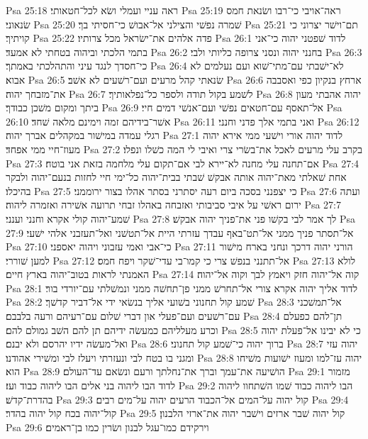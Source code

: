 Psa 25:18  ראה עניי ועמלי ושׂא לכל־חטאותי׃
Psa 25:19  ראה־אויבי כי־רבו ושׂנאת חמס שׂנאוני׃
Psa 25:20  שׁמרה נפשׁי והצילני אל־אבושׁ כי־חסיתי בך׃
Psa 25:21  תם־וישׁר יצרוני כי קויתיך׃
Psa 25:22  פדה אלהים את־ישׂראל מכל צרותיו׃
Psa 26:1  לדוד שׁפטני יהוה כי־אני בתמי הלכתי וביהוה בטחתי לא אמעד׃
Psa 26:2  בחנני יהוה ונסני צרופה כליותי ולבי׃
Psa 26:3  כי־חסדך לנגד עיני והתהלכתי באמתך׃
Psa 26:4  לא־ישׁבתי עם־מתי־שׁוא ועם נעלמים לא אבוא׃
Psa 26:5  שׂנאתי קהל מרעים ועם־רשׁעים לא אשׁב׃
Psa 26:6  ארחץ בנקיון כפי ואסבבה את־מזבחך יהוה׃
Psa 26:7  לשׁמע בקול תודה ולספר כל־נפלאותיך׃
Psa 26:8  יהוה אהבתי מעון ביתך ומקום משׁכן כבודך׃
Psa 26:9  אל־תאסף עם־חטאים נפשׁי ועם־אנשׁי דמים חיי׃
Psa 26:10  אשׁר־בידיהם זמה וימינם מלאה שׁחד׃
Psa 26:11  ואני בתמי אלך פדני וחנני׃
Psa 26:12  רגלי עמדה במישׁור במקהלים אברך יהוה׃
Psa 27:1  לדוד יהוה אורי וישׁעי ממי אירא יהוה מעוז־חיי ממי אפחד׃
Psa 27:2  בקרב עלי מרעים לאכל את־בשׂרי צרי ואיבי לי המה כשׁלו ונפלו׃
Psa 27:3  אם־תחנה עלי מחנה לא־יירא לבי אם־תקום עלי מלחמה בזאת אני בוטח׃
Psa 27:4  אחת שׁאלתי מאת־יהוה אותה אבקשׁ שׁבתי בבית־יהוה כל־ימי חיי לחזות בנעם־יהוה ולבקר בהיכלו׃
Psa 27:5  כי יצפנני בסכה ביום רעה יסתרני בסתר אהלו בצור ירוממני׃
Psa 27:6  ועתה ירום ראשׁי על איבי סביבותי ואזבחה באהלו זבחי תרועה אשׁירה ואזמרה ליהוה׃
Psa 27:7  שׁמע־יהוה קולי אקרא וחנני וענני׃
Psa 27:8  לך אמר לבי בקשׁו פני את־פניך יהוה אבקשׁ׃
Psa 27:9  אל־תסתר פניך ממני אל־תט־באף עבדך עזרתי היית אל־תטשׁני ואל־תעזבני אלהי ישׁעי׃
Psa 27:10  כי־אבי ואמי עזבוני ויהוה יאספני׃
Psa 27:11  הורני יהוה דרכך ונחני בארח מישׁור למען שׁוררי׃
Psa 27:12  אל־תתנני בנפשׁ צרי כי קמו־בי עדי־שׁקר ויפח חמס׃
Psa 27:13  לולא האמנתי לראות בטוב־יהוה בארץ חיים׃
Psa 27:14  קוה אל־יהוה חזק ויאמץ לבך וקוה אל־יהוה׃
Psa 28:1  לדוד אליך יהוה אקרא צורי אל־תחרשׁ ממני פן־תחשׁה ממני ונמשׁלתי עם־יורדי בור׃
Psa 28:2  שׁמע קול תחנוני בשׁועי אליך בנשׂאי ידי אל־דביר קדשׁך׃
Psa 28:3  אל־תמשׁכני עם־רשׁעים ועם־פעלי און דברי שׁלום עם־רעיהם ורעה בלבבם׃
Psa 28:4  תן־להם כפעלם וכרע מעלליהם כמעשׂה ידיהם תן להם השׁב גמולם להם׃
Psa 28:5  כי לא יבינו אל־פעלת יהוה ואל־מעשׂה ידיו יהרסם ולא יבנם׃
Psa 28:6  ברוך יהוה כי־שׁמע קול תחנוני׃
Psa 28:7  יהוה עזי ומגני בו בטח לבי ונעזרתי ויעלז לבי ומשׁירי אהודנו׃
Psa 28:8  יהוה עז־למו ומעוז ישׁועות משׁיחו הוא׃
Psa 28:9  הושׁיעה את־עמך וברך את־נחלתך ורעם ונשׂאם עד־העולם׃
Psa 29:1  מזמור לדוד הבו ליהוה בני אלים הבו ליהוה כבוד ועז׃
Psa 29:2  הבו ליהוה כבוד שׁמו השׁתחוו ליהוה בהדרת־קדשׁ׃
Psa 29:3  קול יהוה על־המים אל־הכבוד הרעים יהוה על־מים רבים׃
Psa 29:4  קול־יהוה בכח קול יהוה בהדר׃
Psa 29:5  קול יהוה שׁבר ארזים וישׁבר יהוה את־ארזי הלבנון׃
Psa 29:6  וירקידם כמו־עגל לבנון ושׂרין כמו בן־ראמים׃
